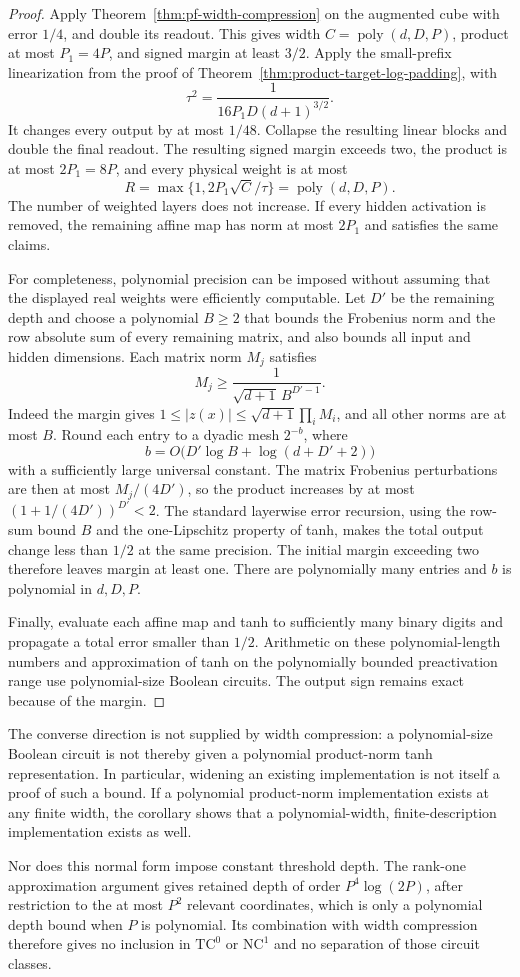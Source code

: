 \begin{proof}
Apply Theorem~\ref{thm:pf-width-compression} on the augmented cube with
error $1/4$, and double its readout. This gives width
$C=\operatorname{poly}(d,D,P)$, product at most $P_1=4P$, and signed
margin at least $3/2$. Apply the small-prefix linearization from the
proof of Theorem~\ref{thm:product-target-log-padding}, with
\[
 \tau^2=\frac1{16P_1D(d+1)^{3/2}}.
\]
It changes every output by at most $1/48$. Collapse the resulting linear
blocks and double the final readout. The resulting signed margin exceeds
two, the product is at most $2P_1=8P$, and every physical weight is at
most
\[
 R=\max\{1,2P_1\sqrt C/\tau\}
   =\operatorname{poly}(d,D,P).
\]
The number of weighted layers does not increase. If every hidden
activation is removed, the remaining affine map has norm at most
$2P_1$ and satisfies the same claims.

For completeness, polynomial precision can be imposed without assuming
that the displayed real weights were efficiently computable. Let $D'$
be the remaining depth and choose a polynomial $B\ge2$ that bounds the
Frobenius norm and the row absolute sum of every remaining matrix, and
also bounds all input and hidden dimensions. Each matrix norm $M_j$
satisfies
\[
 M_j\ge\frac1{\sqrt{d+1}\,B^{D'-1}}.
\]
Indeed the margin gives
$1\le |z(x)|\le\sqrt{d+1}\prod_iM_i$, and all other norms are at most
$B$. Round each entry to a dyadic mesh $2^{-b}$, where
\[
 b=O\bigl(D'\log B+\log(d+D'+2)\bigr)
\]
with a sufficiently large universal constant. The matrix Frobenius
perturbations are then at most $M_j/(4D')$, so the product increases
by at most $(1+1/(4D'))^{D'}<2$. The standard layerwise error recursion,
using the row-sum bound $B$ and the one-Lipschitz property of tanh,
makes the total output change less than $1/2$ at the same precision.
The initial margin exceeding two therefore leaves margin at least one.
There are polynomially many entries and $b$ is polynomial in $d,D,P$.

Finally, evaluate each affine map and tanh to sufficiently many binary
digits and propagate a total error smaller than $1/2$. Arithmetic on
these polynomial-length numbers and approximation of tanh on the
polynomially bounded preactivation range use polynomial-size Boolean
circuits. The output sign remains exact because of the margin.
\end{proof}

The converse direction is not supplied by width compression: a
polynomial-size Boolean circuit is not thereby given a polynomial
product-norm tanh representation. In particular, widening an existing
implementation is not itself a proof of such a bound. If a polynomial
product-norm implementation exists at any finite width, the corollary
shows that a polynomial-width, finite-description implementation exists
as well.

Nor does this normal form impose constant threshold depth. The
rank-one approximation argument gives retained depth of order
$P^4\log(2P)$, after restriction to the at most $P^2$ relevant
coordinates, which is only a polynomial depth bound when $P$ is
polynomial. Its combination with width compression therefore gives
no inclusion in $\mathrm{TC}^0$ or $\mathrm{NC}^1$ and no separation of
those circuit classes.

